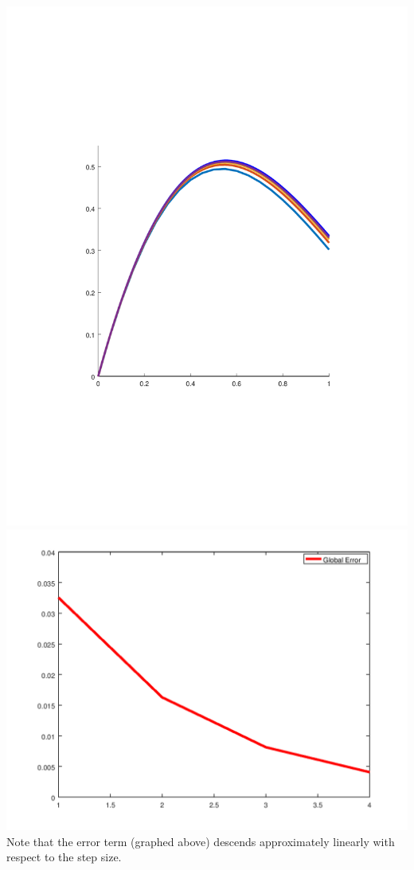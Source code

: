 \documentclass{jhwhw}
\begin{document}
    {\centering
	\includegraphics[scale=0.75]{p4} \\
	\includegraphics[scale=0.75]{p4_err} \\
    }
    \setlength\parindent{0pt}
    Note that the error term (graphed above) descends approximately linearly with respect to the step size.
    \inputminted[linenos,bgcolor=llgray,frame=lines,framesep=2mm]{octave}{p4.m}
\end{document}
